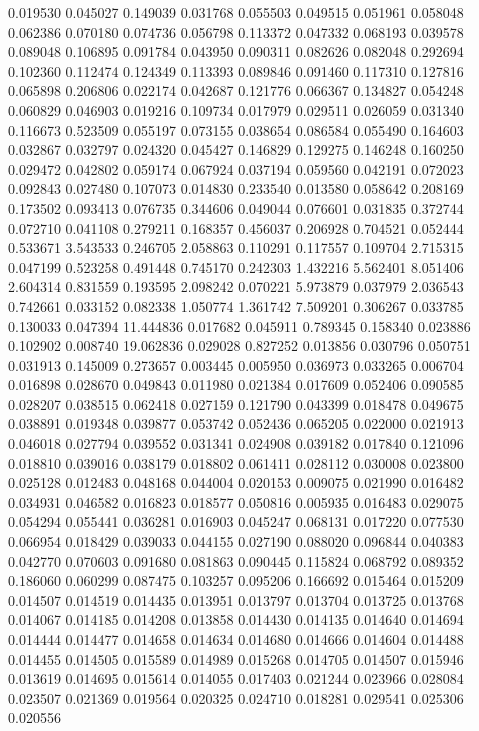0.019530
0.045027
0.149039
0.031768
0.055503
0.049515
0.051961
0.058048
0.062386
0.070180
0.074736
0.056798
0.113372
0.047332
0.068193
0.039578
0.089048
0.106895
0.091784
0.043950
0.090311
0.082626
0.082048
0.292694
0.102360
0.112474
0.124349
0.113393
0.089846
0.091460
0.117310
0.127816
0.065898
0.206806
0.022174
0.042687
0.121776
0.066367
0.134827
0.054248
0.060829
0.046903
0.019216
0.109734
0.017979
0.029511
0.026059
0.031340
0.116673
0.523509
0.055197
0.073155
0.038654
0.086584
0.055490
0.164603
0.032867
0.032797
0.024320
0.045427
0.146829
0.129275
0.146248
0.160250
0.029472
0.042802
0.059174
0.067924
0.037194
0.059560
0.042191
0.072023
0.092843
0.027480
0.107073
0.014830
0.233540
0.013580
0.058642
0.208169
0.173502
0.093413
0.076735
0.344606
0.049044
0.076601
0.031835
0.372744
0.072710
0.041108
0.279211
0.168357
0.456037
0.206928
0.704521
0.052444
0.533671
3.543533
0.246705
2.058863
0.110291
0.117557
0.109704
2.715315
0.047199
0.523258
0.491448
0.745170
0.242303
1.432216
5.562401
8.051406
2.604314
0.831559
0.193595
2.098242
0.070221
5.973879
0.037979
2.036543
0.742661
0.033152
0.082338
1.050774
1.361742
7.509201
0.306267
0.033785
0.130033
0.047394
11.444836
0.017682
0.045911
0.789345
0.158340
0.023886
0.102902
0.008740
19.062836
0.029028
0.827252
0.013856
0.030796
0.050751
0.031913
0.145009
0.273657
0.003445
0.005950
0.036973
0.033265
0.006704
0.016898
0.028670
0.049843
0.011980
0.021384
0.017609
0.052406
0.090585
0.028207
0.038515
0.062418
0.027159
0.121790
0.043399
0.018478
0.049675
0.038891
0.019348
0.039877
0.053742
0.052436
0.065205
0.022000
0.021913
0.046018
0.027794
0.039552
0.031341
0.024908
0.039182
0.017840
0.121096
0.018810
0.039016
0.038179
0.018802
0.061411
0.028112
0.030008
0.023800
0.025128
0.012483
0.048168
0.044004
0.020153
0.009075
0.021990
0.016482
0.034931
0.046582
0.016823
0.018577
0.050816
0.005935
0.016483
0.029075
0.054294
0.055441
0.036281
0.016903
0.045247
0.068131
0.017220
0.077530
0.066954
0.018429
0.039033
0.044155
0.027190
0.088020
0.096844
0.040383
0.042770
0.070603
0.091680
0.081863
0.090445
0.115824
0.068792
0.089352
0.186060
0.060299
0.087475
0.103257
0.095206
0.166692
0.015464
0.015209
0.014507
0.014519
0.014435
0.013951
0.013797
0.013704
0.013725
0.013768
0.014067
0.014185
0.014208
0.013858
0.014430
0.014135
0.014640
0.014694
0.014444
0.014477
0.014658
0.014634
0.014680
0.014666
0.014604
0.014488
0.014455
0.014505
0.015589
0.014989
0.015268
0.014705
0.014507
0.015946
0.013619
0.014695
0.015614
0.014055
0.017403
0.021244
0.023966
0.028084
0.023507
0.021369
0.019564
0.020325
0.024710
0.018281
0.029541
0.025306
0.020556
